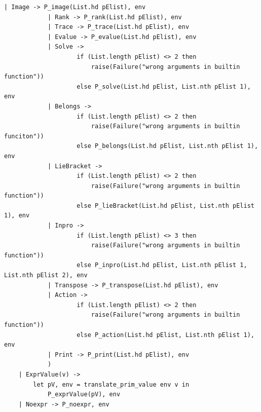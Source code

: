\documentclass[12pt]{article} %
\begin{document}
\begin{lstlisting}[style=appendix, caption=translate.ml]
            | Image -> P_image(List.hd pElist), env
            | Rank -> P_rank(List.hd pElist), env
            | Trace -> P_trace(List.hd pElist), env
            | Evalue -> P_evalue(List.hd pElist), env
            | Solve -> 
                    if (List.length pElist) <> 2 then
                        raise(Failure("wrong arguments in builtin function"))
                    else P_solve(List.hd pElist, List.nth pElist 1), env
            | Belongs -> 
                    if (List.length pElist) <> 2 then
                        raise(Failure("wrong arguments in builtin funciton"))
                    else P_belongs(List.hd pElist, List.nth pElist 1), env
            | LieBracket ->
                    if (List.length pElist) <> 2 then
                        raise(Failure("wrong arguments in builtin function"))
                    else P_lieBracket(List.hd pElist, List.nth pElist 1), env
            | Inpro ->
                    if (List.length pElist) <> 3 then
                        raise(Failure("wrong arguments in builtin function"))
                    else P_inpro(List.hd pElist, List.nth pElist 1, List.nth pElist 2), env
            | Transpose -> P_transpose(List.hd pElist), env
            | Action -> 
                    if (List.length pElist) <> 2 then
                        raise(Failure("wrong arguments in builtin function"))
                    else P_action(List.hd pElist, List.nth pElist 1), env
            | Print -> P_print(List.hd pElist), env
            )  
    | ExprValue(v) -> 
        let pV, env = translate_prim_value env v in
            P_exprValue(pV), env
    | Noexpr -> P_noexpr, env


\end{lstlisting}
\end{document}
